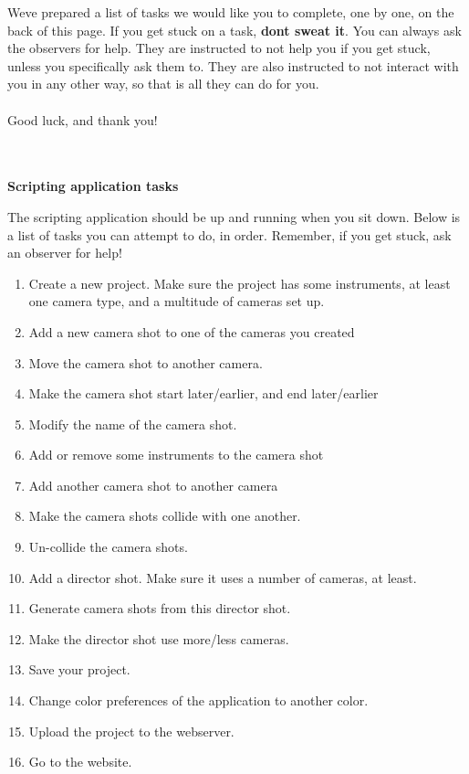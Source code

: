 We\textquotesingle ve prepared a list of tasks we would like you to complete, one by one, on the back of this page. If you get stuck on a task, \textbf{don\textquotesingle t sweat it}. You can always ask the observers for help. They are instructed to not help you if you get stuck, unless you specifically ask them to. They are also instructed to not interact with you in any other way, so that is all they can do for you.\\\\
Good luck, and thank you!\\\\\\
\begin{large}
\textbf{Scripting application tasks}\\
\end{large}
The scripting application should be up and running when you sit down. Below is a list of tasks you can attempt to do, in order. Remember, if you get stuck, ask an observer for help!\\
\begin{enumerate}
\item Create a new project. Make sure the project has some instruments, at least one camera type, and a multitude of cameras set up.
\item Add a new camera shot to one of the cameras you created
\item Move the camera shot to another camera.
\item Make the camera shot start later/earlier, and end later/earlier
\item Modify the name of the camera shot.
\item Add or remove some instruments to the camera shot
\item Add another camera shot to another camera
\item Make the camera shots collide with one another.
\item Un-collide the camera shots.
\item Add a director shot. Make sure it uses a number of cameras, at least.
\item Generate camera shots from this director shot.
\item Make the director shot use more/less cameras.
\item Save your project.
\item Change color preferences of the application to another color.
\item Upload the project to the webserver.
\item Go to the website.
\end{enumerate}
